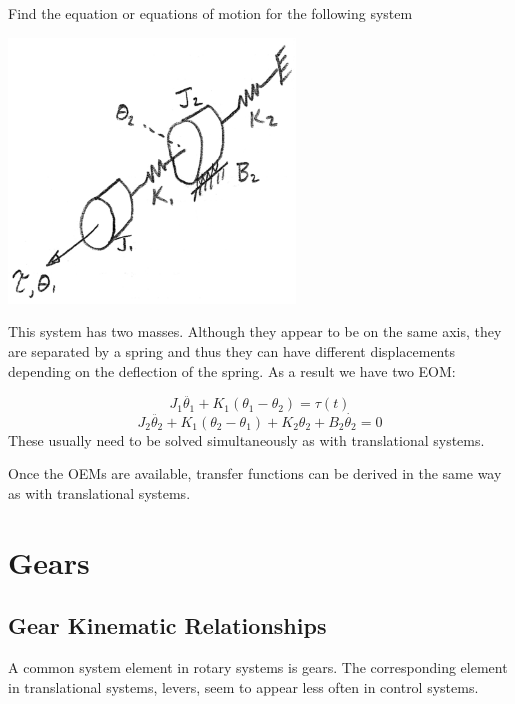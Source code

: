 \begin{ExampleSmall}
Find the equation or equations of motion for the following system

\includegraphics[width=3.0in]{figs03/00743a.png}

This system has two masses.  Although they appear to be on the same axis, they are separated by a spring and thus they can have different displacements depending on the deflection of the spring.  As a result we have two EOM:

\[
J_1\ddot{\theta_1} + K_1(\theta_1 - \theta_2) = \tau(t)
\]
\[
J_2\ddot{\theta_2} + K_1(\theta_2 - \theta_1) + K_2\theta_2 + B_2\dot{\theta_2} = 0
\]
These usually need to be solved simultaneously as with translational systems.

\end{ExampleSmall}

Once the OEMs are available, transfer functions can be derived in the same way as with translational systems.

\section{Gears}
% 

\subsection{Gear Kinematic Relationships}\label{gearkinematics}

A common system element in rotary systems is gears. 
The corresponding element in translational systems, levers, seem to appear less often in control systems.

